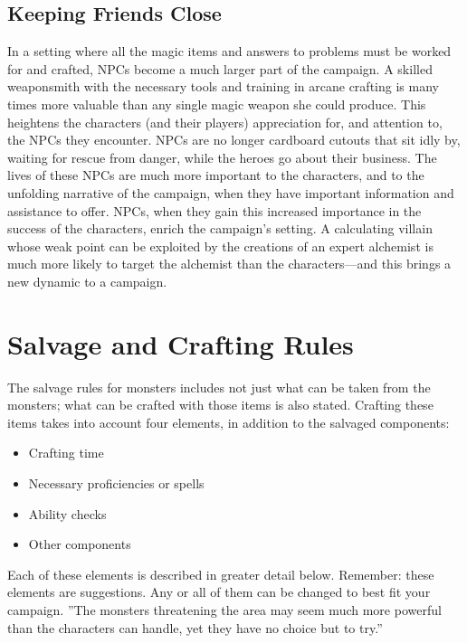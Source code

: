 \documentclass[10pt,a4paper,twoside,twocolumn,openany,bg=print,nodeprecatedcode]{dndbook}
\begin{document}
\subsection{Keeping Friends Close}
In a setting where all the magic items and answers to problems must be worked for and crafted, NPCs become a much larger part of the campaign. A skilled weaponsmith with the necessary tools and training in arcane crafting is many times more valuable than any single magic weapon she could produce.
This heightens the characters (and their players) appreciation for, and attention to, the NPCs they encounter. NPCs are no longer cardboard cutouts that sit idly by, waiting for rescue from danger, while the heroes go about their business. The lives of these NPCs are much more important to the characters, and to the unfolding narrative of the campaign, when they have important information and assistance to offer.
NPCs, when they gain this increased importance in the success of the characters, enrich the campaign's setting. A calculating villain whose weak point can be exploited by the creations of an expert alchemist is much more likely to target the alchemist than the characters—and this brings a new dynamic to a campaign.
\section{Salvage and Crafting Rules}
The salvage rules for monsters includes not just what can be taken from the monsters; what can be crafted with those items is also stated.
Crafting these items takes into account four elements, in addition to the salvaged components:

\begin{itemize}
\item Crafting time
\item Necessary proficiencies or spells
\item Ability checks
\item Other components
\end{itemize}

Each of these elements is described in greater detail below. Remember: these elements are suggestions. Any or all of them can be changed to best fit your campaign.
\DndQuote%
{}
{''The monsters threatening the area may seem much more powerful than the characters can handle, yet they have no choice but to try.''}
{}
\end{document}
